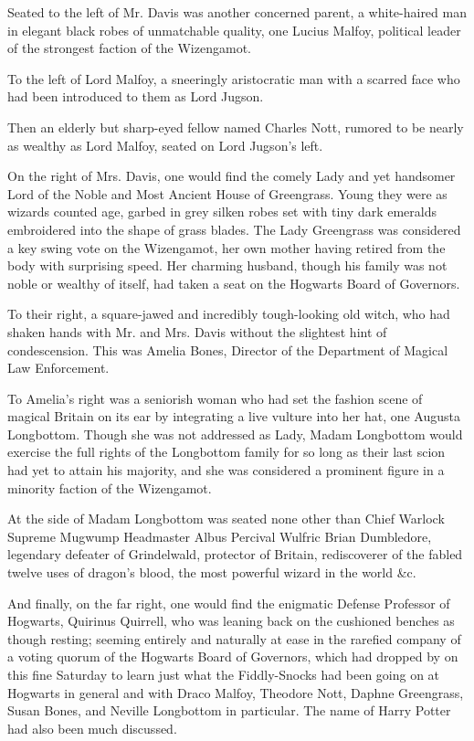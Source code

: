 Seated to the left of Mr. Davis was another concerned parent, a
white-haired man in elegant black robes of unmatchable quality, one
Lucius Malfoy, political leader of the strongest faction of the
Wizengamot.

To the left of Lord Malfoy, a sneeringly aristocratic man with a scarred
face who had been introduced to them as Lord Jugson.

Then an elderly but sharp-eyed fellow named Charles Nott, rumored to be
nearly as wealthy as Lord Malfoy, seated on Lord Jugson's left.

On the right of Mrs. Davis, one would find the comely Lady and yet
handsomer Lord of the Noble and Most Ancient House of Greengrass. Young
they were as wizards counted age, garbed in grey silken robes set with
tiny dark emeralds embroidered into the shape of grass blades. The Lady
Greengrass was considered a key swing vote on the Wizengamot, her own
mother having retired from the body with surprising speed. Her charming
husband, though his family was not noble or wealthy of itself, had taken
a seat on the Hogwarts Board of Governors.

To their right, a square-jawed and incredibly tough-looking old witch,
who had shaken hands with Mr. and Mrs. Davis without the slightest hint
of condescension. This was Amelia Bones, Director of the Department of
Magical Law Enforcement.

To Amelia's right was a seniorish woman who had set the fashion scene of
magical Britain on its ear by integrating a live vulture into her hat,
one Augusta Longbottom. Though she was not addressed as Lady, Madam
Longbottom would exercise the full rights of the Longbottom family for
so long as their last scion had yet to attain his majority, and she was
considered a prominent figure in a minority faction of the Wizengamot.

At the side of Madam Longbottom was seated none other than Chief Warlock
Supreme Mugwump Headmaster Albus Percival Wulfric Brian Dumbledore,
legendary defeater of Grindelwald, protector of Britain, rediscoverer of
the fabled twelve uses of dragon's blood, the most powerful wizard in
the world \&c.

And finally, on the far right, one would find the enigmatic Defense
Professor of Hogwarts, Quirinus Quirrell, who was leaning back on the
cushioned benches as though resting; seeming entirely and naturally at
ease in the rarefied company of a voting quorum of the Hogwarts Board of
Governors, which had dropped by on this fine Saturday to learn just what
the Fiddly-Snocks had been going on at Hogwarts in general and with
Draco Malfoy, Theodore Nott, Daphne Greengrass, Susan Bones, and Neville
Longbottom in particular. The name of Harry Potter had also been much
discussed.

